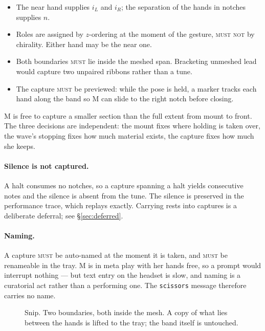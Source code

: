 \documentclass[11pt,a4paper]{article}
\newcommand{\MUST}{\textsc{must}}
\newcommand{\MUSTNOT}{\textsc{must not}}
\theoremstyle{definition}
\theoremstyle{plain}
\theoremstyle{remark}
\newcommand{\spools}{%
  \fill[ribL,opacity=.45,rounded corners=2pt] (1.55,5.40) rectangle (2.45,5.95);
  \fill[ribR,opacity=.45,rounded corners=2pt] (5.55,5.40) rectangle (6.45,5.95);
  \node[font=\scriptsize] at (2,6.22) {left spool};
  \node[font=\scriptsize] at (6,6.22) {right spool};
}
\newcommand{\musician}{%
  \draw[gray] (4,-0.10) circle (0.23);
  \node[font=\scriptsize] at (4,-0.10) {M};
}
\newcommand{\axes}{%
  \draw[->,gray,thin] (0.85,4.30) -- (1.45,4.30) node[right,font=\scriptsize]{$x$};
  \draw[->,gray,thin] (0.85,4.30) -- (0.85,4.90) node[above,font=\scriptsize]{$z$};
}
\newcommand{\ribbonszipped}{%
  \draw[ribL,opacity=.45,line width=16pt,line join=round]
    (2,5.40) -- (2,4.60) -- (3.72,4.20) -- (3.72,2.20) -- (3.10,1.70) -- (3.10,0.70);
  \draw[ribR,opacity=.45,line width=16pt,line join=round]
    (6,5.40) -- (6,4.60) -- (4.28,4.20) -- (4.28,2.20) -- (4.90,1.70) -- (4.90,0.70);
}
\newcommand{\mesh}[2]{%
  \draw[gray!75,decorate,decoration={zigzag,segment length=5pt,amplitude=3pt}]
    (4,#1) -- (4,#2);
}
\newcommand{\mountclips}{%
  \fill[amb,opacity=.75,rounded corners=1pt] (3.76,1.05) rectangle (3.92,1.45);
  \fill[amb,opacity=.75,rounded corners=1pt] (4.08,1.05) rectangle (4.24,1.45);
}
\newcommand{\handat}[2]{\filldraw[fill=white,draw=gray!80,thin] (#1,#2) circle (0.17);}
\begin{document}
\begin{itemize}[leftmargin=*]
\item The near hand supplies $i_L$ and $i_R$; the separation of the hands in notches supplies $n$.
\item Roles are assigned by $z$-ordering at the moment of the gesture, \MUSTNOT{} by chirality.
      Either hand may be the near one.
\item Both boundaries \MUST{} lie inside the meshed span. Bracketing unmeshed lead would capture
      two unpaired ribbons rather than a tune.
\item The capture \MUST{} be previewed: while the pose is held, a marker tracks each hand along the
      band so M can slide to the right notch before closing.
\end{itemize}

M is free to capture a smaller section than the full extent from mount to front. The three
decisions are independent: the mount fixes where holding is taken over, the wave's stopping fixes
how much material exists, the capture fixes how much she keeps.

\paragraph{Silence is not captured.} A halt consumes no notches, so a capture spanning a halt
yields consecutive notes and the silence is absent from the tune. The silence is preserved in the
performance trace, which replays exactly. Carrying rests into captures is a deliberate deferral;
see \S\ref{sec:deferred}.

\paragraph{Naming.} A capture \MUST{} be auto-named at the moment it is taken, and \MUST{} be
renameable in the tray. M is in meta play with her hands free, so a prompt would interrupt nothing
--- but text entry on the headset is slow, and naming is a curatorial act rather than a performing
one. The \texttt{scissors} message therefore carries no name.

\begin{figure}[H]\centering
{}
\caption{Snip. Two boundaries, both inside the mesh. A copy of what lies between the hands is
lifted to the tray; the band itself is untouched.}
\end{figure}
\end{document}
